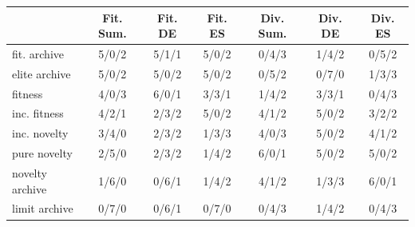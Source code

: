 \begin{tabular}{l|ccc|ccc}
\toprule
{} & Fit. Sum. & Fit. DE & Fit. ES & Div. Sum. & Div. DE & Div. ES \\
\midrule
fit. archive    &     5/0/2 &   5/1/1 &   5/0/2 &     0/4/3 &   1/4/2 &   0/5/2 \\
elite archive   &     5/0/2 &   5/0/2 &   5/0/2 &     0/5/2 &   0/7/0 &   1/3/3 \\
fitness         &     4/0/3 &   6/0/1 &   3/3/1 &     1/4/2 &   3/3/1 &   0/4/3 \\
inc. fitness    &     4/2/1 &   2/3/2 &   5/0/2 &     4/1/2 &   5/0/2 &   3/2/2 \\
inc. novelty    &     3/4/0 &   2/3/2 &   1/3/3 &     4/0/3 &   5/0/2 &   4/1/2 \\
pure novelty    &     2/5/0 &   2/3/2 &   1/4/2 &     6/0/1 &   5/0/2 &   5/0/2 \\
novelty archive &     1/6/0 &   0/6/1 &   1/4/2 &     4/1/2 &   1/3/3 &   6/0/1 \\
limit archive   &     0/7/0 &   0/6/1 &   0/7/0 &     0/4/3 &   1/4/2 &   0/4/3 \\
\bottomrule
\end{tabular}
